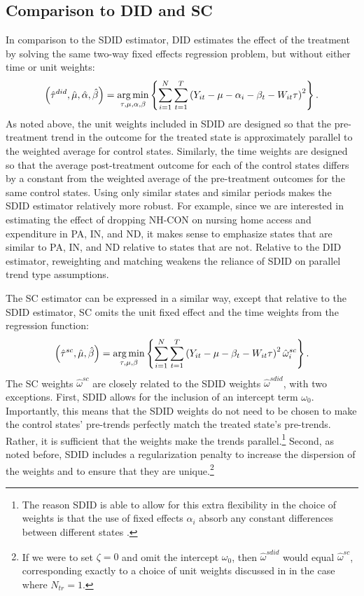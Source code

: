 \documentclass[../Main.tex]{subfiles}
\begin{document}
\subsection{Comparison to DID and SC}

In comparison to the SDID estimator, DID estimates the effect of the treatment by solving the same two-way fixed effects regression problem, but without either time or unit weights:
\begin{equation} \label{eq:did_reg}
    \left(\hat{\tau}^{did},\hat{\mu},\hat{\alpha},\hat{\beta}\right)=\operatorname*{arg\,min}_{\tau,\mu,\alpha,\beta}\left\{\sum_{i=1}^N\sum_{t=1}^T\left(Y_{it}-\mu-\alpha_i-\beta_t-W_{it}\tau\right)^2\right\}.
\end{equation}
As noted above, the unit weights included in SDID are designed so that the pre-treatment trend in the outcome for the treated state is approximately parallel to the weighted average for control states. Similarly, the time weights are designed so that the average post-treatment outcome for each of the control states differs by a constant from the weighted average of the pre-treatment outcomes for the same control states. Using only similar states and similar periods makes the SDID estimator relatively more robust. For example, since we are interested in estimating the effect of dropping NH-CON on nursing home access and expenditure in PA, IN, and ND, it makes sense to emphasize states that are similar to PA, IN, and ND relative to states that are not. Relative to the DID estimator, reweighting and matching weakens the reliance of SDID on parallel trend type assumptions.

The SC estimator can be expressed in a similar way, except that relative to the SDID estimator, SC omits the unit fixed effect and the time weights from the regression function:
\begin{equation} \label{eq:sc_reg}
    \left(\hat{\tau}^{sc},\hat{\mu},\hat{\beta}\right)=\operatorname*{arg\,min}_{\tau,\mu,\beta}\left\{\sum_{i=1}^N\sum_{t=1}^T\left(Y_{it}-\mu-\beta_t-W_{it}\tau\right)^2\hat{\omega}_i^{sc}\right\}.
\end{equation}
The SC weights $\hat{\omega}^{sc}$ are closely related to the SDID weights $\hat{\omega}^{sdid}$, with two exceptions. First, SDID allows for the inclusion of an intercept term $\omega_0$. Importantly, this means that the SDID weights do not need to be chosen to make the control states' pre-trends perfectly match the treated state's pre-trends. Rather, it is sufficient that the weights make the trends parallel.\footnote{The reason SDID is able to allow for this extra flexibility in the choice of weights is that the use of fixed effects $\alpha_i$ absorb any constant differences between different states \citep{arkhangelsky2021synthetic}.} Second, as noted before, SDID includes a regularization penalty to increase the dispersion of the weights and to ensure that they are unique.\footnote{If we were to set $\zeta=0$ and omit the intercept $\omega_0$, then $\hat{\omega}^{sdid}$ would equal $\hat{\omega}^{sc}$, corresponding exactly to a choice of unit weights discussed in \citet{abadie2010synthetic} in the case where $N_{tr}=1$.}
\end{document}

